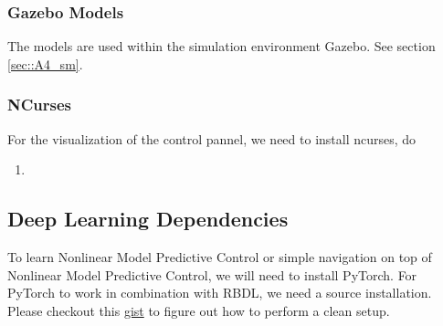 \subsubsection{Gazebo Models}
The models are used within the simulation environment Gazebo. See section \ref{sec::A4_sm}.
\FloatBarrier
\subsubsection{NCurses}
For the visualization of the control pannel, we need to install ncurses, do
\begin{enumerate}
	\item {}
\end{enumerate}
\FloatBarrier
\subsection{Deep Learning Dependencies}
\label{sec::A53_dl}
To learn Nonlinear Model Predictive Control or simple navigation on top of Nonlinear Model Predictive Control, we will need to install PyTorch. For PyTorch to work in combination with RBDL, we need a source installation. Please checkout this \href{https://gist.github.com/mhubii/1c1049fb5043b8be262259efac4b89d5}{gist} to figure out how to perform a clean setup.
